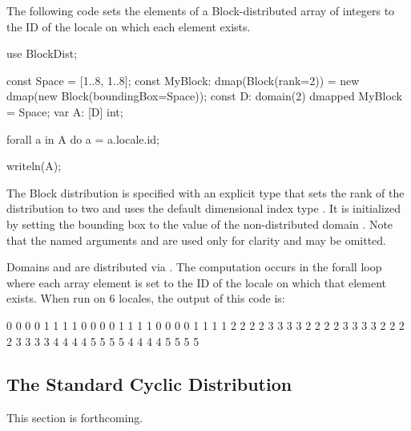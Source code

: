\begin{example}
The following code sets the elements of a Block-distributed array of
integers to the ID of the locale on which each element exists.
\begin{chapel}
use BlockDist;

const Space = [1..8, 1..8];
const MyBlock: dmap(Block(rank=2)) = new dmap(new Block(boundingBox=Space));
const D: domain(2) dmapped MyBlock = Space;
var A: [D] int;

forall a in A do
  a = a.locale.id;

writeln(A);
\end{chapel}
The Block distribution  is specified with an explicit
type that sets the rank of the distribution to two and uses the
default dimensional index type .  It is initialized by
setting the bounding box to the value of the non-distributed domain
.  Note that the named arguments  and
 are used only for clarity and may be omitted.

Domains  and  are distributed via .  The
computation occurs in the forall loop where each array element is set
to the ID of the locale on which that element exists.  When run on 6
locales, the output of this code is:
\begin{chapel}
0 0 0 0 1 1 1 1
0 0 0 0 1 1 1 1
0 0 0 0 1 1 1 1
2 2 2 2 3 3 3 3
2 2 2 2 3 3 3 3
2 2 2 2 3 3 3 3
4 4 4 4 5 5 5 5
4 4 4 4 5 5 5 5
\end{chapel}
\end{example}

\subsection{The Standard Cyclic Distribution}
\label{Cyclic_Dist}

This section is forthcoming.
